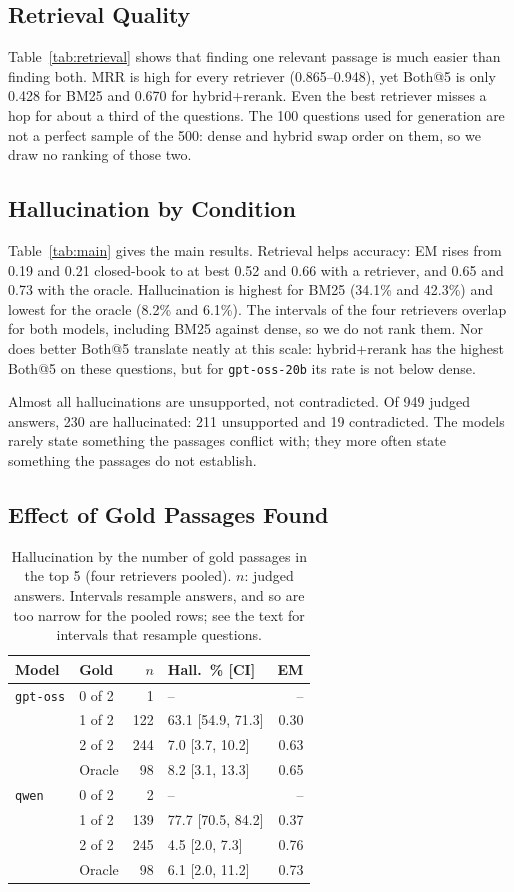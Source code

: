 \documentclass[10pt,a4paper,twocolumn]{article}
\newcommand{\model}[1]{\texttt{#1}}
\begin{document}
\subsection{Retrieval Quality}
Table~\ref{tab:retrieval} shows that finding one relevant passage is much easier than finding both. MRR is high for every retriever
(0.865--0.948), yet Both@5 is only 0.428 for BM25 and 0.670 for hybrid+rerank. Even the best retriever misses a hop for about a third
of the questions. The 100 questions used for generation are not a perfect sample of the 500: dense and hybrid swap order on them, so we
draw no ranking of those two.

\subsection{Hallucination by Condition}
Table~\ref{tab:main} gives the main results. Retrieval helps accuracy: EM rises from 0.19 and 0.21 closed-book to at best 0.52 and 0.66 with
a retriever, and 0.65 and 0.73 with the oracle. Hallucination is highest for BM25 (34.1\% and 42.3\%) and lowest for the oracle (8.2\% and
6.1\%). The intervals of the four retrievers overlap for both models, including BM25 against dense, so we do not rank them. Nor does better
Both@5 translate neatly at this scale: hybrid+rerank has the highest Both@5 on these questions, but for \model{gpt-oss-20b} its rate is not
below dense.

Almost all hallucinations are unsupported, not contradicted. Of 949 judged answers, 230 are hallucinated: 211 unsupported and 19 contradicted.
The models rarely state something the passages conflict with; they more often state something the passages do not establish.

\subsection{Effect of Gold Passages Found}

\begin{table}[t]
\centering\small
\caption{Hallucination by the number of gold passages in the top 5 (four retrievers pooled). $n$: judged answers. Intervals resample answers,
and so are too narrow for the pooled rows; see the text for intervals that resample questions.}\label{tab:gold}
\begin{tabular}{@{}llrlr@{}}
\toprule
Model & Gold & $n$ & Hall.\ \% [CI] & EM \\
\midrule
\model{gpt-oss} & 0 of 2 & 1 & -- & -- \\
 & 1 of 2 & 122 & 63.1 [54.9, 71.3] & 0.30 \\
 & 2 of 2 & 244 & 7.0 [3.7, 10.2] & 0.63 \\
 & Oracle & 98 & 8.2 [3.1, 13.3] & 0.65 \\
\midrule
\model{qwen} & 0 of 2 & 2 & -- & -- \\
 & 1 of 2 & 139 & 77.7 [70.5, 84.2] & 0.37 \\
 & 2 of 2 & 245 & 4.5 [2.0, 7.3] & 0.76 \\
 & Oracle & 98 & 6.1 [2.0, 11.2] & 0.73 \\
\bottomrule
\end{tabular}
\end{table}
\end{document}
